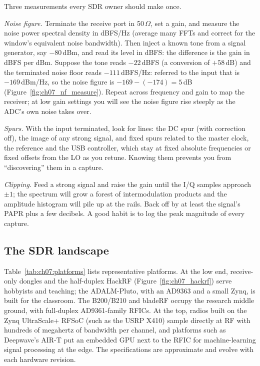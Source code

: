 \begin{inpractice}
Three measurements every SDR owner should make once.

\emph{Noise figure.} Terminate the receive port in 50\,$\Omega$, set a gain, and measure the noise power
spectral density in dBFS/Hz (average many FFTs and correct for the window's equivalent noise bandwidth).
Then inject a known tone from a signal generator, say $-80$\,dBm, and read its level in dBFS: the
difference is the gain in dBFS per dBm. Suppose the tone reads $-22$\,dBFS (a conversion of $+58$\,dB)
and the terminated noise floor reads $-111$\,dBFS/Hz: referred to the input that is $-169$\,dBm/Hz, so the
noise figure is $-169-(-174)=5$\,dB (Figure~\ref{fig:ch07_nf_measure}). Repeat across frequency and gain to
map the receiver; at low gain settings you will see the noise figure rise steeply as the ADC's own noise
takes over.

\emph{Spurs.} With the input terminated, look for lines: the DC spur (with correction off), the image of
any strong signal, and fixed spurs related to the master clock, the reference and the USB controller,
which stay at fixed absolute frequencies or fixed offsets from the LO as you retune. Knowing them prevents
you from ``discovering'' them in a capture.

\emph{Clipping.} Feed a strong signal and raise the gain until the I/Q samples approach $\pm1$; the
spectrum will grow a forest of intermodulation products and the amplitude histogram will pile up at the
rails. Back off by at least the signal's PAPR plus a few decibels. A good habit is to log the peak
magnitude of every capture.
\end{inpractice}

\subsection{The SDR landscape}
\label{sec:ch07:platforms}

Table~\ref{tab:ch07:platforms} lists representative platforms. At the low end, receive-only dongles and
the half-duplex HackRF (Figure~\ref{fig:ch07_hackrf}) serve hobbyists and teaching; the ADALM-Pluto,
with an AD9363 and a small Zynq, is built for the classroom. The B200/B210 and bladeRF occupy the
research middle ground, with full-duplex AD9361-family RFICs. At the top, radios built on the Zynq
UltraScale+ RFSoC (such as the USRP X410) sample directly at RF with hundreds of megahertz of bandwidth
per channel, and platforms such as Deepwave's AIR-T put an embedded GPU next to the RFIC for
machine-learning signal processing at the edge. The specifications are approximate and evolve with each
hardware revision.

